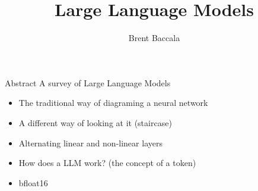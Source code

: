 \documentclass{beamer}
\title{Large Language Models}
\author{Brent Baccala}
\institute{\tt cosine@freesoft.org}
\begin{document}
\begin{frame}
\titlepage
\begin{block}{Abstract}
A survey of Large Language Models
\end{block}
\end{frame}

\begin{frame}
\begin{itemize}
\item The traditional way of diagraming a neural network
\item A different way of looking at it (staircase)
\item Alternating linear and non-linear layers
\item How does a LLM work? (the concept of a token)
\item bfloat16
\end{itemize}
\end{frame}
\end{document}

